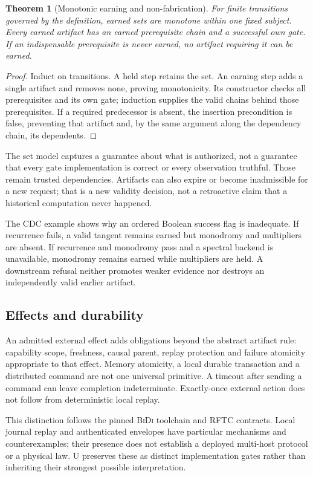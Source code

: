 \documentclass[11pt]{article}
\newtheorem{theorem}[definition]{Theorem}
\theoremstyle{remark}
\newcommand{\bidi}{\textsc{BiDi}}
\newcommand{\cdc}{\textsc{CDC}}
\begin{document}
\begin{theorem}[Monotonic earning and non-fabrication]
For finite transitions governed by the definition, earned sets are monotone
within one fixed subject. Every earned artifact has an earned prerequisite
chain and a successful own gate. If an indispensable prerequisite is never
earned, no artifact requiring it can be earned.
\end{theorem}
\begin{proof}
Induct on transitions. A held step retains the set. An earning step adds a
single artifact and removes none, proving monotonicity. Its constructor
checks all prerequisites and its own gate; induction supplies the valid
chains behind those prerequisites. If a required predecessor is absent,
the insertion precondition is false, preventing that artifact and, by
the same argument along the dependency chain, its dependents.
\end{proof}

The set model captures a guarantee about what is authorized, not a guarantee
that every gate implementation is correct or every observation truthful.
Those remain trusted dependencies. Artifacts can also expire or become
inadmissible for a new request; that is a new validity decision, not a
retroactive claim that a historical computation never happened.

The \cdc{} example shows why an ordered Boolean success flag is inadequate.
If recurrence fails, a valid tangent remains earned but monodromy and
multipliers are absent. If recurrence and monodromy pass and a spectral
backend is unavailable, monodromy remains earned while multipliers are
held. A downstream refusal neither promotes weaker evidence nor destroys
an independently valid earlier artifact.

\subsection{Effects and durability}

An admitted external effect adds obligations beyond the abstract artifact
rule: capability scope, freshness, causal parent, replay protection and
failure atomicity appropriate to that effect. Memory atomicity, a local
durable transaction and a distributed command are not one universal
primitive. A timeout after sending a command can leave completion
indeterminate. Exactly-once external action does not follow from deterministic
local replay.

This distinction follows the pinned \bidi{} toolchain and RFTC contracts.
Local journal replay and authenticated envelopes have particular mechanisms
and counterexamples; their presence does not establish a deployed multi-host
protocol or a physical law. U preserves these as distinct implementation
gates rather than inheriting their strongest possible interpretation.
\end{document}
